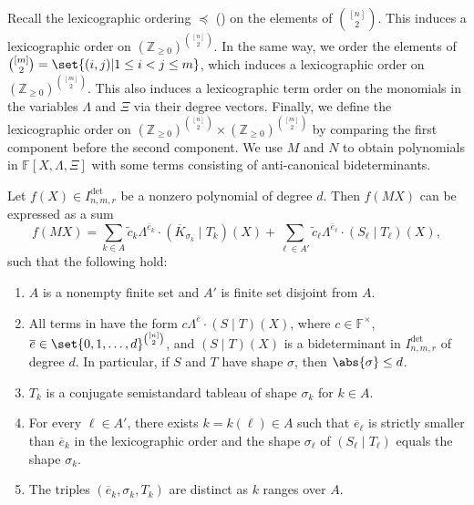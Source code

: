 \documentclass[10pt,a4paper]{amsart}
\newcommand*\Z{\mathbb{Z}}
\newcommand*\F{\mathbb{F}}
\begin{document}
Recall the lexicographic ordering $\preceq$ () on the elements of $\binom{[n]}{2}$.
This induces a lexicographic order on $(\Z_{\geq 0})^{\binom{[n]}{2}}$.
In the same way, we order the elements of $\binom{[m]}{2} = \set{(i, j) | 1 \leq i < j \leq m}$, which induces a lexicographic order on $(\Z_{\geq 0})^{\binom{[m]}{2}}$.
This also induces a lexicographic term order on the monomials in the variables $\Lambda$ and $\Xi$ via their degree vectors.
Finally, we define the lexicographic order on $(\Z_{\geq 0})^{\binom{[n]}{2}} \times (\Z_{\geq 0})^{\binom{[m]}{2}}$ by comparing the first component before the second component.
We use $M$ and $N$ to obtain polynomials in $\F[X, \Lambda, \Xi]$ with some terms consisting of anti-canonical bideterminants.

\begin{lem}\label{lem:bideterminant_leading_terms}
Let $f(X) \in I^{\det}_{n, m, r}$ be a nonzero polynomial of degree $d$.
Then $f(MX)$ can be expressed as a sum
\begin{equation}\label{eq:expansion1}
    f(MX) = \sum_{k \in A} \widetilde{c}_{k} \Lambda^{\overline{e}_k}\cdot (\overline{K}_{\sigma_k}\mid T_k)(X) + \sum_{\ell\in A'} \widetilde{c}_{\ell} \Lambda^{\overline{e}_\ell}\cdot (S_\ell\mid T_\ell)(X),
\end{equation}
such that the following hold:
\begin{enumerate}
    \item\label{item:expansion1_i0} $A$ is a nonempty finite set and $A'$ is finite set disjoint from $A$.
    \item\label{item:expansion1_i1} All terms in  have the form $c \Lambda^{\overline{e}}\cdot (S\mid T)(X)$, where $c\in \F^\times$, $\overline{e}\in \set{0,1,\dots,d}^{\binom{[n]}{2}}$,
    and $(S\mid T)(X)$ is a bideterminant in $I^{\det}_{n, m, r}$ of degree $d$.
    In particular, if $S$ and $T$ have shape $\sigma$, then $\abs{\sigma} \leq d$.
    \item $T_k$ is a conjugate semistandard tableau of shape $\sigma_k$ for $k\in A$.
    \item\label{item:expansion1_i1.5} For every $\ell\in A'$, there exists $k=k(\ell)\in A$ such that $\overline{e}_\ell$ is strictly smaller than $\overline{e}_k$ in the lexicographic order and the shape $\sigma_\ell$ of $(S_\ell\mid T_\ell)$ equals the shape $\sigma_k$.
    \item\label{item:expansion1_i2} The triples $(\overline{e}_k,\sigma_k,T_k)$ are distinct as $k$ ranges over $A$.
\end{enumerate} 
\end{lem}
\end{document}
